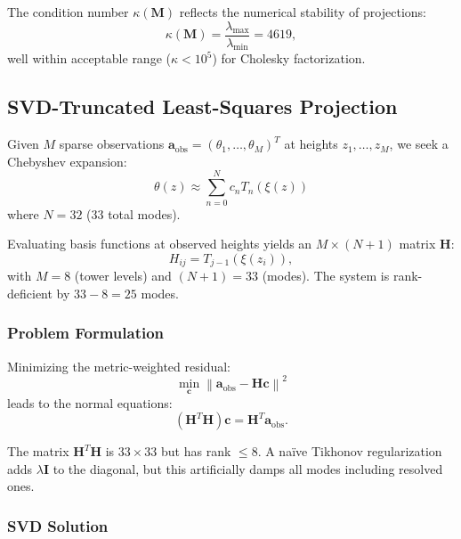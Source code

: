 \documentclass[11pt,a4paper]{article}
\begin{document}
The condition number $\kappa(\mathbf{M})$ reflects the numerical stability of projections:
\begin{equation}
\kappa(\mathbf{M}) = \frac{\lambda_{\max}}{\lambda_{\min}} = 4619,
\end{equation}
well within acceptable range ($\kappa < 10^5$) for Cholesky factorization.

\subsection{SVD-Truncated Least-Squares Projection}
\label{sec:methods:svd}

Given $M$ sparse observations $\mathbf{a}_{\mathrm{obs}} = (\theta_1, \ldots, \theta_M)^T$ at heights $z_1, \ldots, z_M$, we seek a Chebyshev expansion:
\begin{equation}
\theta(z) \approx \sum_{n=0}^{N} c_n T_n(\xi(z))
\end{equation}
where $N = 32$ (33 total modes).

Evaluating basis functions at observed heights yields an $M \times (N+1)$ matrix $\mathbf{H}$:
\begin{equation}
H_{ij} = T_{j-1}(\xi(z_i)),
\label{eq:h_matrix}
\end{equation}
with $M = 8$ (tower levels) and $(N+1) = 33$ (modes). The system is rank-deficient by $33 - 8 = 25$ modes.

\subsubsection{Problem Formulation}

Minimizing the metric-weighted residual:
\begin{equation}
\min_{\mathbf{c}} \left\| \mathbf{a}_{\mathrm{obs}} - \mathbf{H} \mathbf{c} \right\|^2
\end{equation}
leads to the normal equations:
\begin{equation}
\left( \mathbf{H}^T \mathbf{H} \right) \mathbf{c} = \mathbf{H}^T \mathbf{a}_{\mathrm{obs}}.
\label{eq:normal}
\end{equation}

The matrix $\mathbf{H}^T \mathbf{H}$ is $33 \times 33$ but has rank $\leq 8$. A na\"ive Tikhonov regularization adds $\lambda \mathbf{I}$ to the diagonal, but this artificially damps all modes including resolved ones.

\subsubsection{SVD Solution}
\end{document}
